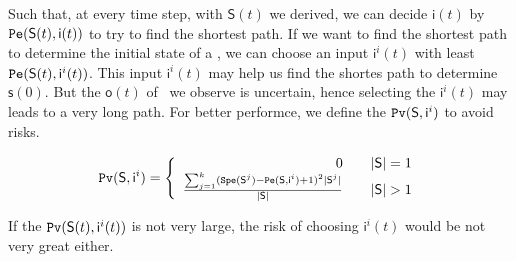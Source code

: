 Such that, at every time step, with $\mathsf{S}(t)$ we derived, we can decide $\mathsf{i}(t)$ by ${\tt Pe}(\mathsf{S}(t),\mathsf{ i}(t))$ to try to find the shortest path. If we want to find the shortest path to determine the initial state of a \BCN, we can choose an input $\mathsf{ i}^{i}(t)$ with least ${\tt Pe}(\mathsf{S}(t), \mathsf{ i}^{i}(t))$. This input $\mathsf{i}^{i}(t)$ may help us find the shortes path to determine $\mathsf{s}(0)$. But the $\mathsf{o}(t)$ of \BCNs\ we observe is uncertain, hence selecting the $\mathsf{ i}^{i}(t)$ may leads to a very long path. For better performce, we define the ${\tt Pv}(\mathsf{S}, \mathsf{ i}^{i})$ to avoid risks.
\begin{definition} 
\[\Pv(\mathsf{S}, \mathsf{ i}^{i})=\left\{
\begin{array}{rcl}
0      &      & {|\mathsf{S}|=1}\\
\frac{\sum_{j=1}^k (\Spe(\mathsf{S}^{j})-\Pe(\mathsf{S}, \mathsf{ i}^{i})+1)^2 |\mathsf{S}^{j}|}{ |\mathsf{S}|}      &      & {|\mathsf{S}|>1}
\end{array} \right. \]
\end{definition}
If the ${\tt Pv}(\mathsf{S}(t), \mathsf{i}^{i}(t))$ is not very large, the risk of choosing $\mathsf{ i}^{i}(t)$ would be not very great either.
